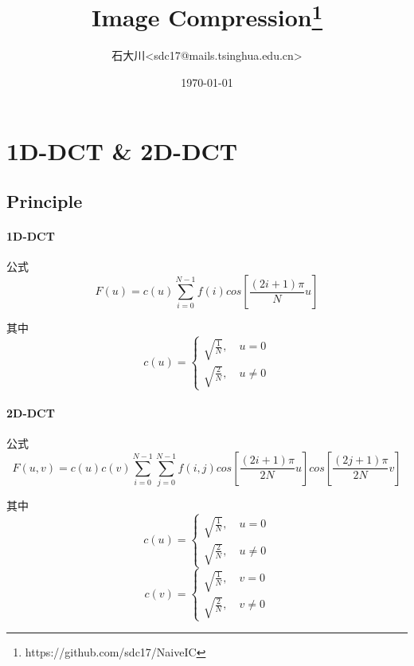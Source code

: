 \documentclass[UTF8]{ctexart}
\title{Image Compression\footnote{https://github.com/sdc17/NaiveIC}}
\author{石大川\quad <sdc17@mails.tsinghua.edu.cn>}
\date{\today}
\begin{document}
	\maketitle
	\tableofcontents
	\section{1D-DCT \& 2D-DCT}
	
	\subsection{Principle}
	
	\paragraph{1D-DCT} 公式
	\begin{equation*}
	F(u) = c(u) \sum_{i=0}^{N-1}f(i)cos[\frac{(2i+1)\pi }{N}u] 
	\end{equation*}
	
	其中
	\begin{equation*}
	c(u) = \begin{cases}
	\sqrt{\frac{1}{N}}, \quad u=0 \\
	\sqrt{\frac{2}{N}}, \quad u \neq 0
	\end{cases}
	\end{equation*} 
	
	\paragraph{2D-DCT} 公式
	\begin{equation*}
	F(u, v) = c(u)c(v) \sum_{i=0}^{N-1}\sum_{j=0}^{N-1}f(i, j)cos[\frac{(2i+1)\pi }{2N}u]cos[\frac{(2j+1)\pi}{2N}v] 
	\end{equation*}
	
	其中
	\begin{equation*}
	c(u) = \begin{cases}
	\sqrt{\frac{1}{N}}, \quad u=0 \\
	\sqrt{\frac{2}{N}}, \quad u \neq 0
	\end{cases}
	\end{equation*} 
	\begin{equation*}
	c(v) = \begin{cases}
	\sqrt{\frac{1}{N}}, \quad v=0 \\
	\sqrt{\frac{2}{N}}, \quad v \neq 0
	\end{cases}
	\end{equation*} 
	
\end{document}
